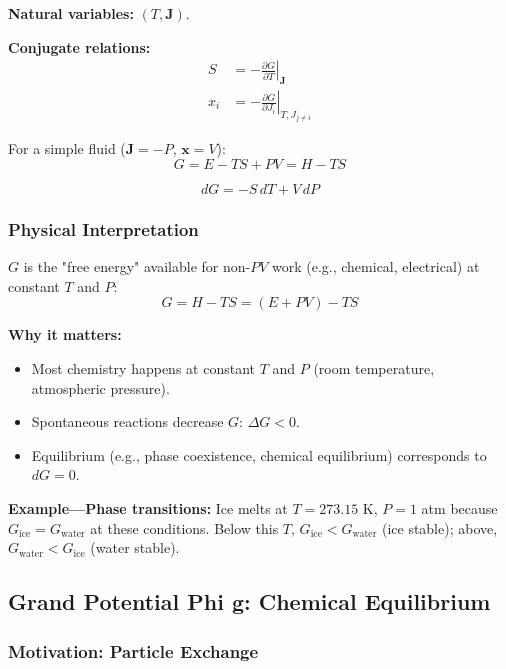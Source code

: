 \documentclass[9pt,twocoloumn]{article}
\begin{document}
\textbf{Natural variables:} $(T, \mathbf{J})$.

\textbf{Conjugate relations:}
\begin{align}
S &= -\left. \frac{\partial G}{\partial T} \right|_{\mathbf{J}} \\
x_i &= -\left. \frac{\partial G}{\partial J_i} \right|_{T, J_{j \neq i}}
\end{align}

For a simple fluid ($\mathbf{J} = -P$, $\mathbf{x} = V$):
\begin{equation}
G = E - TS + PV = H - TS
\end{equation}

\begin{equation}
dG = -S \, dT + V \, dP
\end{equation}

\subsubsection{Physical Interpretation}

$G$ is the "free energy" available for non-$PV$ work (e.g., chemical, electrical) at constant $T$ and $P$:
\begin{equation}
G = H - TS = (E + PV) - TS
\end{equation}

\textbf{Why it matters:}
\begin{itemize}
    \item Most chemistry happens at constant $T$ and $P$ (room temperature, atmospheric pressure).
    \item Spontaneous reactions decrease $G$: $\Delta G < 0$.
    \item Equilibrium (e.g., phase coexistence, chemical equilibrium) corresponds to $dG = 0$.
\end{itemize}

\textbf{Example—Phase transitions:} Ice melts at $T = 273.15$ K, $P = 1$ atm because $G_{\text{ice}} = G_{\text{water}}$ at these conditions. Below this $T$, $G_{\text{ice}} < G_{\text{water}}$ (ice stable); above, $G_{\text{water}} < G_{\text{ice}}$ (water stable).

\subsection{Grand Potential Phi g: Chemical Equilibrium}

\subsubsection{Motivation: Particle Exchange}
\end{document}
